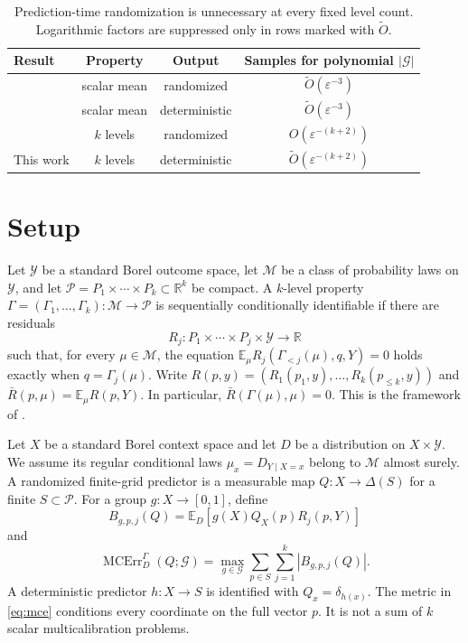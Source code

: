 \documentclass{article}
\theoremstyle{definition}
\theoremstyle{remark}
\newcommand{\E}{\mathbb E}
\newcommand{\1}{\mathbf 1}
\newcommand{\cG}{\mathcal G}
\newcommand{\cM}{\mathcal M}
\newcommand{\cP}{\mathcal P}
\newcommand{\simplex}{\Delta}
\newcommand{\MCE}{\operatorname{MCErr}}
\begin{document}
\begin{table}[t]
\centering
\small
\setlength{\tabcolsep}{5pt}
\begin{tabular}{@{}lccc@{}}
\toprule
Result & Property & Output & Samples for polynomial $|\cG|$ \\
\midrule
\citet{collina2026sample} & scalar mean & randomized & $\widetilde O(\varepsilon^{-3})$ \\
\citet{noarovroth2026deterministic} & scalar mean & deterministic & $\widetilde O(\varepsilon^{-3})$ \\
\citet{lu2026multilevel} & $k$ levels & randomized & $O(\varepsilon^{-(k+2)})$ \\
This work & $k$ levels & deterministic & $\widetilde O(\varepsilon^{-(k+2)})$ \\
\bottomrule
\end{tabular}
\caption{Prediction-time randomization is unnecessary at every fixed level count. Logarithmic factors are suppressed only in rows marked with $\widetilde O$.}
\label{tab:comparison}
\end{table}

\section{Setup}

Let $\mathcal Y$ be a standard Borel outcome space, let $\cM$ be a class of probability laws on $\mathcal Y$, and let $\cP=P_1\times\cdots\times P_k\subset\mathbb R^k$ be compact. A $k$-level property $\Gamma=(\Gamma_1,\ldots,\Gamma_k):\cM\to\cP$ is sequentially conditionally identifiable if there are residuals
\[
R_j:P_1\times\cdots\times P_j\times\mathcal Y\to\mathbb R
\]
such that, for every $\mu\in\cM$, the equation $\E_\mu R_j(\Gamma_{<j}(\mu),q,Y)=0$ holds exactly when $q=\Gamma_j(\mu)$. Write $R(p,y)=(R_1(p_1,y),\ldots,R_k(p_{\le k},y))$ and $\bar R(p,\mu)=\E_\mu R(p,Y)$. In particular, $\bar R(\Gamma(\mu),\mu)=0$. This is the framework of \citet{lu2026multilevel}.

Let $X$ be a standard Borel context space and let $D$ be a distribution on $X\times\mathcal Y$. We assume its regular conditional laws $\mu_x=D_{Y\mid X=x}$ belong to $\cM$ almost surely. A randomized finite-grid predictor is a measurable map $Q:X\to\simplex(S)$ for a finite $S\subset\cP$. For a group $g:X\to[0,1]$, define
\[
B_{g,p,j}(Q)=\E_D[g(X)Q_X(p)R_j(p,Y)]
\]
and
\begin{equation}
\MCE_D^\Gamma(Q;\cG)=\max_{g\in\cG}\sum_{p\in S}\sum_{j=1}^k|B_{g,p,j}(Q)|.
\label{eq:mce}
\end{equation}
A deterministic predictor $h:X\to S$ is identified with $Q_x=\delta_{h(x)}$. The metric in \eqref{eq:mce} conditions every coordinate on the full vector $p$. It is not a sum of $k$ scalar multicalibration problems.
\end{document}
